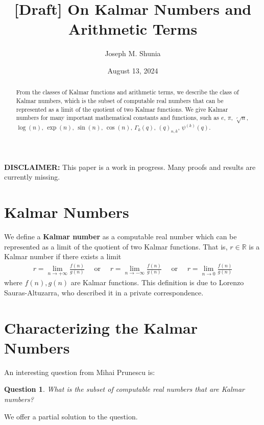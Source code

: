 \documentclass[10pt,a4paper]{article}
\title{[Draft] On Kalmar Numbers and Arithmetic Terms}
\author{Joseph M. Shunia}
\date{August 13, 2024}
\theoremstyle{plain}
\newtheorem{question}{Question}[section]
\begin{document}
\maketitle

\begin{abstract}
\noindent From the classes of Kalmar functions and arithmetic terms, we describe the class of Kalmar numbers, which is the subset of computable real numbers that can be represented as a limit of the quotient of two Kalmar functions. We give Kalmar numbers for many important mathematical constants and functions, such as $e$, $\pi$, $\sqrt[r]{n}$, $\log(n)$, $\exp(n)$, $\sin(n)$, $\cos(n)$, $\Gamma_k(q)$, $(q)_{n,k}$, $\psi^{(k)}(q)$.
\end{abstract}

\textbf{DISCLAIMER:} This paper is a work in progress. Many proofs and results are currently missing.

\section{Kalmar Numbers}
We define a \textbf{Kalmar number} as a computable real number which can be represented as a limit of the quotient of two Kalmar functions. That is, $r \in \mathbb{R}$ is a Kalmar number if there exists a limit
\begin{align*}
r = \lim_{n \to +\infty} \frac{f(n)}{g(n)}
\quad \text{ or } \quad 
r = \lim_{n \to -\infty} \frac{f(n)}{g(n)}
\quad \text{ or } \quad 
r = \lim_{n \to 0} \frac{f(n)}{g(n)}
\end{align*}
where $f(n),g(n)$ are Kalmar functions. This definition is due to Lorenzo Sauras-Altuzarra, who described it in a private correspondence.

\section{Characterizing the Kalmar Numbers}
An interesting question from Mihai Prunescu is:
\begin{question}
What is the subset of computable real numbers that are Kalmar numbers?
\end{question}
We offer a partial solution to the question.
\end{document}
